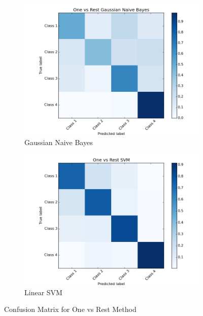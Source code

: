 \documentclass[11pt]{article}
\begin{document}
\begin{figure}[h]
	
	\begin{subfigure}[b]{0.5\textwidth}
		\includegraphics[width=\textwidth]{ovr_gnb.png}
		\caption{Gaussian Naive Bayes}
	\end{subfigure}
	\begin{subfigure}[b]{0.5\textwidth}
		\includegraphics[width=\textwidth]{ovr_svm.png}
		\caption{Linear SVM}
	\end{subfigure}
	\caption{Confusion Matrix for One vs Rest Method}
	\label{fig:cm_ovr}
\end{figure}
\end{document}

